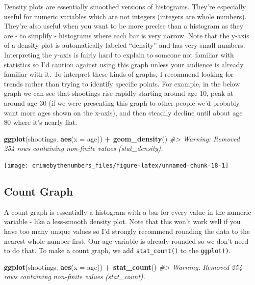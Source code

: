 \documentclass[
  12pt,
]{book}
\newenvironment{Shaded}{\begin{snugshade}}{\end{snugshade}}
\newcommand{\CommentTok}[1]{\textcolor[rgb]{0.37,0.37,0.37}{\textit{#1}}}
\newcommand{\DataTypeTok}[1]{\textcolor[rgb]{0.27,0.27,0.27}{#1}}
\newcommand{\KeywordTok}[1]{\textcolor[rgb]{0.27,0.27,0.27}{\textbf{#1}}}
\newcommand{\NormalTok}[1]{#1}
\newcommand{\OperatorTok}[1]{\textcolor[rgb]{0.43,0.43,0.43}{\textbf{#1}}}
\newcommand{\StringTok}[1]{\textcolor[rgb]{0.5,0.5,0.5}{#1}}
\begin{document}
Density plots are essentially smoothed versions of histograms. They're especially useful for numeric variables which are not integers (integers are whole numbers). They're also useful when you want to be more precise than a histogram as they are - to simplify - histograms where each bar is very narrow. Note that the y-axis of a density plot is automatically labeled ``density'' and has very small numbers. Interpreting the y-axis is fairly hard to explain to someone not familiar with statistics so I'd caution against using this graph unless your audience is already familiar with it. To interpret these kinds of graphs, I recommend looking for trends rather than trying to identify specific points. For example, in the below graph we can see that shootings rise rapidly starting around age 10, peak at around age 30 (if we were presenting this graph to other people we'd probably want more ages shown on the x-axis), and then steadily decline until about age 80 where it's nearly flat.

\begin{Shaded}
\begin{Highlighting}[]
\KeywordTok{ggplot}\NormalTok{(shootings, }\KeywordTok{aes}\NormalTok{(}\DataTypeTok{x =}\NormalTok{ age)) }\OperatorTok{+}\StringTok{ }
\StringTok{  }\KeywordTok{geom\_density}\NormalTok{()}
\CommentTok{\#\textgreater{} Warning: Removed 254 rows containing non{-}finite values (stat\_density).}
\end{Highlighting}
\end{Shaded}

\begin{center}\texttt{[image: crimebythenumbers\_files/figure-latex/unnamed-chunk-18-1]} \end{center}

\hypertarget{count-graph}{%
\subsection{Count Graph}\label{count-graph}}

A count graph is essentially a histogram with a bar for every value in the numeric variable - like a less-smooth density plot. Note that this won't work well if you have too many unique values so I'd strongly recommend rounding the data to the nearest whole number first. Our age variable is already rounded so we don't need to do that. To make a count graph, we add \texttt{stat\_count()} to the \texttt{ggplot()}.

\begin{Shaded}
\begin{Highlighting}[]
\KeywordTok{ggplot}\NormalTok{(shootings, }\KeywordTok{aes}\NormalTok{(}\DataTypeTok{x =}\NormalTok{ age)) }\OperatorTok{+}\StringTok{ }
\StringTok{  }\KeywordTok{stat\_count}\NormalTok{()}
\CommentTok{\#\textgreater{} Warning: Removed 254 rows containing non{-}finite values (stat\_count).}
\end{Highlighting}
\end{Shaded}
\end{document}
